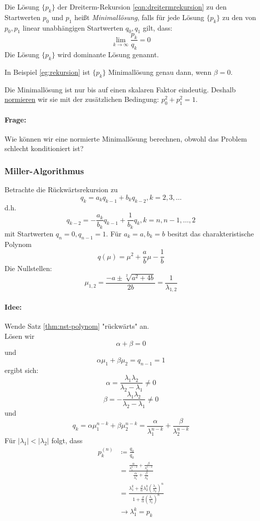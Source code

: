 \begin{definition}[Minimallösung]
Die Lösung $\{p_k\}$ der Dreiterm-Rekursion \eqref{eqn:dreitermrekursion} zu den Startwerten $p_0$ und $p_1$ heißt \emph{Minimallösung}, falls für jede Lösung $\{p_k\}$ zu den von $p_0,p_1$ linear unabhängigen Startwerten $q_0,q_1$ gilt, dass:
\[
\lim_{k \to \infty} \frac{p_k}{q_k}=0
\]
Die Lösung $\{p_k\}$ wird dominante Lösung genannt.
\end{definition}
\begin{example}
In Beispiel \ref{eg:rekursion} ist $\{p_k\}$ Minimallösung genau dann, wenn $\beta=0$.
\end{example}
Die Minimallösung ist nur bis auf einen skalaren Faktor eindeutig. Deshalb \underline{normieren} wir sie mit der zusätzlichen Bedingung: $p_0^2+p_1^2=1$.
\paragraph{Frage:} Wie können wir eine normierte Minimallösung berechnen, obwohl das Problem schlecht konditioniert ist?
\subsubsection{Miller-Algorithmus}
Betrachte die Rückwärtsrekursion zu
\[
q_k=a_kq_{k-1} + b_k q_{k-2} , k=2,3,\ldots
\]
d.h.
\[
q_{k-2}= -\frac{a_k}{b_k}q_{k-1} + \frac{1}{b_k}q_k , k=n,n-1,\ldots,2
\]
mit Startwerten $q_n=0, q_{n-1}=1$. Für $a_k=a, b_k=b$ besitzt das charakteristische Polynom
\[
q(\mu)=\mu^2+ \frac{a}{b}\mu -\frac{1}{b}
\]
Die Nullstellen:
\[
\mu_{1,2}=\frac{-a\pm\sqrt[2]{a^2+4b}}{2b}=\frac{1}{\lambda_{1,2}}
\]
\paragraph{Idee:} Wende Satz \ref{thm:nst-polynom} "rückwärts" an. \\
Lösen wir
\[
\alpha + \beta = 0
\]
und
\[
\alpha\mu_1+\beta\mu_2=q_{n-1}=1
\]
ergibt sich:
\[
\alpha= \frac{\lambda_1\lambda_2}{\lambda_2-\lambda_1} \neq 0
\]
\[
\beta = -\frac{\lambda_1\lambda_2}{\lambda_2-\lambda_1}\neq 0
\]
und
\[
q_k= \alpha \mu_1^{n-k}+ \beta \mu_2^{n-k}= \frac{\alpha}{\lambda_1^{n-k}}+\frac{\beta}{\lambda_2^{n-k}}
\]
Für $|\lambda_1| < |\lambda_2|$ folgt, dass
\begin{align*}
	p_k^{\left( n \right)}
	&\coloneqq \frac{q_k}{q_0} \\
	&= \frac{\frac{\alpha}{\lambda_1^{n-k}}+\frac{\beta}{\lambda_2^{n-k}}}{\frac{\alpha}{\lambda_1^{n}}+\frac{\beta}{\lambda_2^{n}}} \\
	&=\frac{\lambda_1^{k}+\frac{\beta}{\alpha}\lambda_2^{k}\left( \frac{\lambda_1}{\lambda_2} \right)^{n}}{1+\frac{\beta}{\alpha}\left( \frac{\lambda_1}{\lambda_2} \right)^{n}}\\
	&\to \lambda_1^{k}=p_k
\end{align*}
